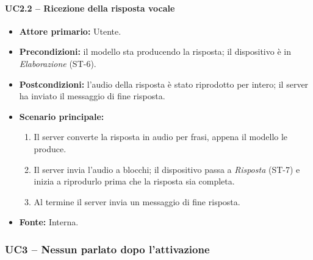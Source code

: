 \documentclass[12pt,a4paper]{article}
\newcommand{\tightlist}{\setlength{\itemsep}{1pt}\setlength{\parskip}{0pt}}
\begin{document}
\paragraph{UC2.2 -- Ricezione della risposta vocale}

\begin{itemize}

\tightlist

\item \textbf{Attore primario:} Utente.

\item \textbf{Precondizioni:} il modello sta producendo la risposta; il dispositivo è in \emph{Elaborazione} (ST-6).

\item \textbf{Postcondizioni:} l'audio della risposta è stato riprodotto per intero; il server ha inviato il messaggio di fine risposta.

\item \textbf{Scenario principale:}

\begin{enumerate}

\tightlist

\item Il server converte la risposta in audio per frasi, appena il modello le produce.

\item Il server invia l'audio a blocchi; il dispositivo passa a \emph{Risposta} (ST-7) e inizia a riprodurlo prima che la risposta sia completa.

\item Al termine il server invia un messaggio di fine risposta.

\end{enumerate}

\item \textbf{Fonte:} Interna.

\end{itemize}



\subsubsection{UC3 -- Nessun parlato dopo l'attivazione}
\end{document}
